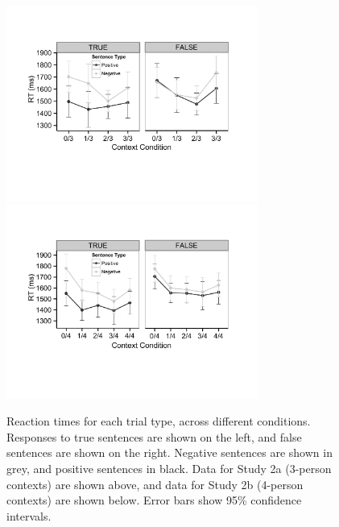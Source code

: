 \documentclass[10pt,letterpaper]{article}
\begin{document}
\begin{figure}
\begin{center} 
\includegraphics[width=3.25in]{figures/study2a_linegraph.pdf}
\includegraphics[width=3.25in]{figures/study2b_linegraph.pdf}
\caption{\label{fig:e2line} Reaction times for each trial type, across different conditions. Responses to true sentences are shown on the left, and false sentences are shown on the right.  Negative sentences are shown in grey, and positive sentences in black.  Data for Study 2a (3-person contexts) are shown above, and data for Study 2b (4-person contexts) are shown below.  Error bars show 95\% confidence intervals.  }
\end{center} 
\end{figure}

\end{document}
